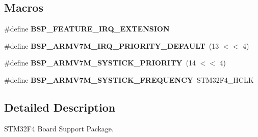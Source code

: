 \subsection*{Macros}
\begin{DoxyCompactItemize}
\item 
\mbox{\label{group__RTEMSBSPsARMSTM32F4_ga5d7d631d3a14b7554160f14eb42f351b}} 
\#define {\bfseries B\+S\+P\+\_\+\+F\+E\+A\+T\+U\+R\+E\+\_\+\+I\+R\+Q\+\_\+\+E\+X\+T\+E\+N\+S\+I\+ON}
\item 
\mbox{\label{group__RTEMSBSPsARMSTM32F4_ga8cbce037173a026946db0e4628939104}} 
\#define {\bfseries B\+S\+P\+\_\+\+A\+R\+M\+V7\+M\+\_\+\+I\+R\+Q\+\_\+\+P\+R\+I\+O\+R\+I\+T\+Y\+\_\+\+D\+E\+F\+A\+U\+LT}~(13 $<$$<$ 4)
\item 
\mbox{\label{group__RTEMSBSPsARMSTM32F4_gaabc09d01f675047eb59c49fc7282017d}} 
\#define {\bfseries B\+S\+P\+\_\+\+A\+R\+M\+V7\+M\+\_\+\+S\+Y\+S\+T\+I\+C\+K\+\_\+\+P\+R\+I\+O\+R\+I\+TY}~(14 $<$$<$ 4)
\item 
\mbox{\label{group__RTEMSBSPsARMSTM32F4_ga484f5ed3be718d51567e87bcbca4783f}} 
\#define {\bfseries B\+S\+P\+\_\+\+A\+R\+M\+V7\+M\+\_\+\+S\+Y\+S\+T\+I\+C\+K\+\_\+\+F\+R\+E\+Q\+U\+E\+N\+CY}~S\+T\+M32\+F4\+\_\+\+H\+C\+LK
\end{DoxyCompactItemize}


\subsection{Detailed Description}
S\+T\+M32\+F4 Board Support Package. 

